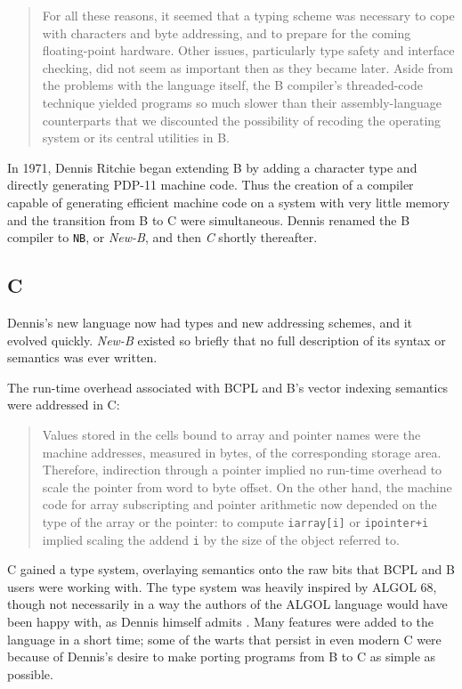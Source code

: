 \begin{quotation}
	For all these reasons, it seemed that a typing scheme was necessary to cope
	with characters and byte addressing, and to prepare for the coming
	floating-point hardware. Other issues, particularly type safety and interface
	checking, did not seem as important then as they became later.
	Aside from the problems with the language itself, the B compiler's
	threaded-code technique yielded programs so much slower than their
	assembly-language counterparts that we discounted the possibility of recoding
	the operating system or its central utilities in B.
	\cite{development_of_c_language_chist_ritchie_1996}
\end{quotation}

In 1971, Dennis Ritchie began extending B by adding a character type and directly generating
PDP-11 machine code.
Thus the creation of a compiler capable of generating efficient machine code on a system with
very little memory and the transition from B to C were simultaneous.
Dennis renamed the B compiler to \texttt{NB}, or \textit{New-B}, and then \textit{C}
shortly thereafter.

\subsection{C}

Dennis's new language now had types and new addressing schemes, and it evolved quickly.
\textit{New-B} existed so briefly that no full description of its syntax or semantics was
ever written.

The run-time overhead associated with BCPL and B's vector indexing semantics were
addressed in C:

\begin{quotation}
	Values stored in the cells bound to array and pointer names were the machine
	addresses, measured in bytes, of the corresponding storage area. Therefore,
	indirection through a pointer implied no run-time overhead to scale the pointer
	from word to byte offset. On the other hand, the machine code for array
	subscripting and pointer arithmetic now depended on the type of the array or
	the pointer: to compute \texttt{iarray[i]} or \texttt{ipointer+i} implied
	scaling the addend \texttt{i} by the size of the object referred to.
	\cite{development_of_c_language_chist_ritchie_1996}
\end{quotation}

C gained a type system, overlaying semantics onto the raw bits that BCPL and B users
were working with.
The type system was heavily inspired by ALGOL 68, though not necessarily in a way the
authors of the ALGOL language would have been happy with, as Dennis himself admits
\cite{development_of_c_language_chist_ritchie_1996}.
Many features were added to the language in a short time; some of the warts that persist in
even modern C were because of Dennis's desire to make porting programs from B to C as
simple as possible.

